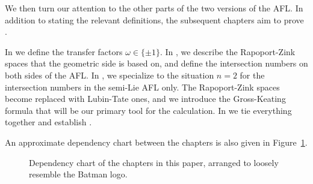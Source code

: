 \begin{itemize}
  \ii We then turn our attention to the other parts of the two versions of the AFL.
  In addition to stating the relevant definitions,
  the subsequent chapters aim to prove .
  \begin{itemize}
    \ii In  we define the transfer factors $\omega \in \{\pm1\}$.
    \ii In , we describe the Rapoport-Zink spaces
    that the geometric side is based on, and define the intersection numbers
    on both sides of the AFL.
    \ii In , we specialize to the situation $n = 2$
    for the intersection numbers in the semi-Lie AFL only.
    The Rapoport-Zink spaces become replaced with Lubin-Tate ones,
    and we introduce the Gross-Keating formula
    that will be our primary tool for the calculation.
    \ii In  we tie everything together and establish
    .
  \end{itemize}
\end{itemize}

An approximate dependency chart between the chapters is also given in Figure~\ref{fig:depchart}.

\begin{figure}[ht]
  \begin{center}
  \end{center}
  \caption{Dependency chart of the chapters in this paper,
    arranged to loosely resemble the Batman logo.}
  \label{fig:depchart}
\end{figure}
